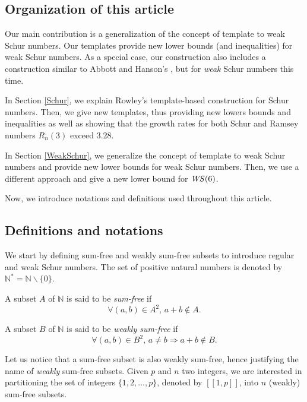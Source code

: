 \subsection{Organization of this article}

Our main contribution is a generalization of the concept of template to weak Schur numbers. Our templates 
provide new lower bounds (and inequalities) for weak Schur numbers. As a special case, our construction also includes  
a construction similar to Abbott and Hanson's \cite{AbbottHanson}, but for \textit{weak} Schur numbers this time.

\par
In Section \ref{Schur}, we explain Rowley's template-based construction for 
Schur numbers. Then, we give new templates, thus providing new lowers bounds and inequalities as well as 
showing that the growth rates for both Schur and Ramsey numbers \(R_n(3)\) exceed 3.28. 

\par
In Section \ref{WeakSchur}, we generalize the concept of template to weak Schur numbers 
and provide new lower bounds for weak Schur numbers. Then, we use a different approach and give a new 
lower bound for \(\mathit{WS}(6)\).

\par
Now, we introduce notations and definitions used throughout this article.

\subsection{Definitions and notations}

We start by defining sum-free and weakly sum-free subsets to introduce regular and weak Schur numbers. 
The set of positive natural numbers is denoted by \(\mathbb{N}^* =\mathbb{N} \backslash \{0\}\).

\begin{definition}
A subset \(A\) of \(\mathbb{N}\) is said to be \textit{sum-free} if
\[ \forall (a,b) \in A^2 \text{, } a+b \notin A.\]
\end{definition}

\begin{definition}
A subset \(B\) of \(\mathbb{N}\) is said to be \textit{weakly sum-free} if
\[ \forall (a,b) \in B^2 \text{, } a \neq b \Longrightarrow a+b \notin B.\]
\end{definition}

Let us notice that a sum-free subset is also weakly sum-free, hence justifying the name of \textit{weakly} sum-free
subsets. Given \(p\) and \(n\) two integers, we are interested in partitioning the set of integers \(\{1, 2, ..., p\}\), 
denoted by \([\![1,p]\!]\), into \(n\) (weakly) sum-free subsets.

